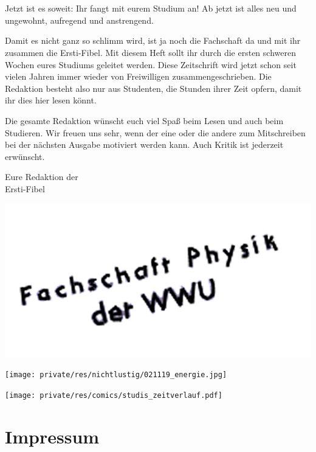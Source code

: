 \section*{\Huge{}}
\begin{multicols*}{2}
Jetzt ist es soweit: Ihr fangt mit eurem Studium an!
Ab jetzt ist alles neu und ungewohnt, aufregend und anstrengend.

Damit es nicht ganz so schlimm wird, ist ja noch die Fachschaft da und mit ihr zusammen die Ersti-Fibel.
Mit diesem Heft sollt ihr durch die ersten schweren Wochen eures Studiums geleitet werden. Diese Zeitschrift wird jetzt schon seit vielen Jahren immer wieder von Freiwilligen zusammengeschrieben.
Die Redaktion besteht also nur aus Studenten, die Stunden ihrer Zeit opfern, damit ihr dies hier lesen könnt.

Die gesamte Redaktion wünscht euch viel Spaß beim Lesen und auch beim Studieren.
Wir freuen uns sehr, wenn der eine oder die andere zum Mitschreiben bei der nächsten Ausgabe motiviert werden kann. Auch Kritik ist jederzeit erwünscht.

Eure Redaktion der\\
Ersti-Fibel

\vspace{-0.75cm}
\hspace{2cm}
\includegraphics{res/fsphys_stempel.png}

\vspace{1.8cm}
\texttt{[image: private/res/nichtlustig/021119\_energie.jpg]}
\vspace{\fill}

\columnbreak

\texttt{[image: private/res/comics/studis\_zeitverlauf.pdf]}

\vspace{-2ex}
\section*{Impressum}
\vspace{-1ex}


\end{multicols*}
